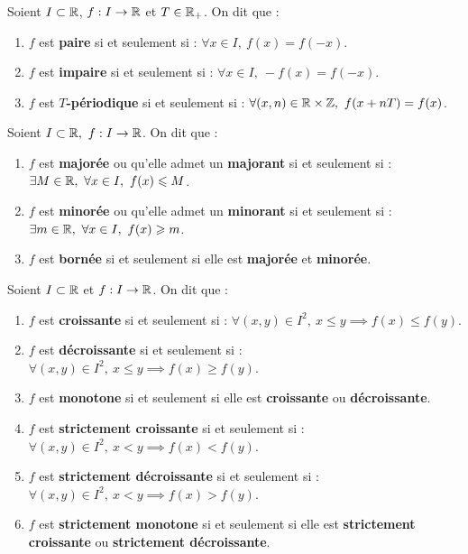 \begin{definition}
	Soient $I \subset \mathbb{R}$, $f : I \to \mathbb{R}$ et $T \in \mathbb{R}_+$. On dit que :
    \begin{enumerate}
        \item $f$ est \textbf{paire} si et seulement si : $\forall x \in I,\ f(x) = f(-x)$.
        \item $f$ est \textbf{impaire} si et seulement si : $\forall x \in I,\ -f(x) = f(-x)$.
        \item $f$ est \textbf{$T$-périodique} si et seulement si : $\forall (x,n) \in \mathbb{R} \times \mathbb{Z},\ f(x + nT) = f(x)$.
    \end{enumerate}
\end{definition}

\begin{definition}
	Soient $I \subset \mathbb{R},\ f : I \to \mathbb{R}$. On dit que :
	\begin{enumerate}
	    \item $f$ est \textbf{majorée} ou qu'elle admet un \textbf{majorant} si et seulement si : $\exists M \in \mathbb{R},\ \forall x \in I,\ f(x) \leqslant M$.
        \item $f$ est \textbf{minorée} ou qu'elle admet un \textbf{minorant} si et seulement si : $\exists m \in \mathbb{R},\ \forall x \in I,\ f(x) \geqslant m$.
        \item $f$ est \textbf{bornée} si et seulement si elle est \textbf{majorée} et \textbf{minorée}.
	\end{enumerate}
\end{definition}

\begin{definition}
	Soient $I \subset \mathbb{R}$ et $f : I \to \mathbb{R}$. On dit que :
    \begin{enumerate}
        \item $f$ est \textbf{croissante} si et seulement si : $\forall (x, y) \in I^2,\ x \leq y \implies f(x) \leq f(y)$.
        \item $f$ est \textbf{décroissante} si et seulement si : $\forall (x, y) \in I^2,\ x \leq y \implies f(x) \geq f(y)$.
        \item $f$ est \textbf{monotone} si et seulement si elle est \textbf{croissante} ou \textbf{décroissante}.
        \item $f$ est \textbf{strictement croissante} si et seulement si : $\forall (x, y) \in I^2,\ x < y \implies f(x) < f(y)$.
        \item $f$ est \textbf{strictement décroissante} si et seulement si : $\forall (x, y) \in I^2,\ x < y \implies f(x) > f(y)$.
        \item $f$ est \textbf{strictement monotone} si et seulement si elle est \textbf{strictement croissante} ou \textbf{strictement décroissante}.
    \end{enumerate}
\end{definition}

